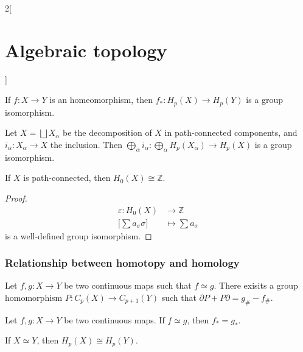 \documentclass[../../../main_math.tex]{subfiles}
\begin{document}
\begin{multicols}{2}[\section{Algebraic topology}]
	\begin{corollary}
		If $f:X\to Y$ is an homeomorphism, then $f_*: H_p(X) \to H_p(Y)$ is a group isomorphism.
	\end{corollary}

	\begin{proposition}
		Let $X=\bigsqcup X_{\alpha}$ be the decomposition of $X$ in path-connected components, and $i_{\alpha}:X_{\alpha} \to X$ the inclusion. Then $\bigoplus_{\alpha} i_{\alpha}: \bigoplus_{\alpha} H_p(X_{\alpha}) \to H_p(X)$ is a group isomorphism.
	\end{proposition}
	
	\begin{proposition}
		If $X$ is path-connected, then $H_0(X)\cong \mathbb{Z}$.
	\end{proposition}

	\begin{proof}
		\begin{align*}
			\varepsilon: H_0(X)&\longrightarrow \mathbb{Z} \\
			\bigg[ \sum a_{\sigma}\sigma \bigg] &\longmapsto \sum a_{\sigma}
		\end{align*}
	is a well-defined group isomorphism.
	\end{proof}
	
	\subsubsection{Relationship between homotopy and homology}
	\begin{lemma}
		Let $f,g:X\to Y$ be two continuous maps such that $f\simeq g$. There exisits a group homomorphism $P: C_p(X)\to C_{p+1}(Y)$ such that $\partial P + P\partial =g_{\#}-f_{\#}$.
	\end{lemma}

	\begin{theorem}
		Let $f,g:X\to Y$ be two continuous maps. If $f\simeq g$, then $f_*=g_*$.
	\end{theorem}

	\begin{corollary}
		If $X\simeq Y$, then $H_p(X)\cong H_p(Y)$.
	\end{corollary}
 
\end{multicols}
\end{document}
